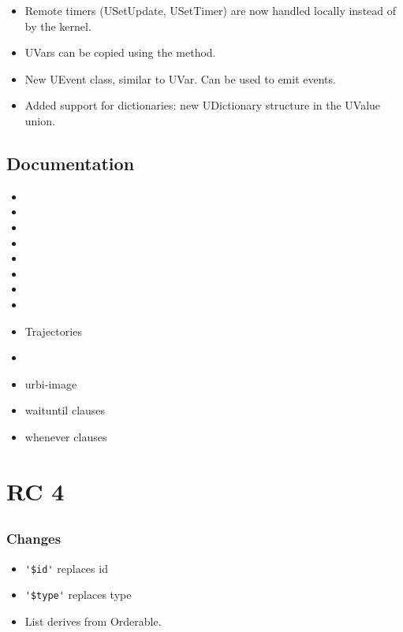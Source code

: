 \begin{itemize}
\item Remote timers (USetUpdate, USetTimer) are now handled locally
  instead of by the kernel.
\item UVars can be copied using the  method.
\item New UEvent class, similar to UVar. Can be used to emit events.
\item Added support for dictionaries: new UDictionary structure in the
  UValue union.
\end{itemize}

\subsection{Documentation}

\begin{itemize}
\item {}
\item {}
\item {}
\item {}
\item {}
\item {}
\item {}
\item {}
\item Trajectories
\item {}
\item urbi-image
\item waituntil clauses
\item whenever clauses
\end{itemize}

\section{ RC 4}

\subsection{\us}
\subsubsection{Changes}

\begin{itemize}
\item \lstinline|'$id'| replaces id
\item \lstinline|'$type'| replaces type
\item List derives from Orderable.
\end{itemize}

